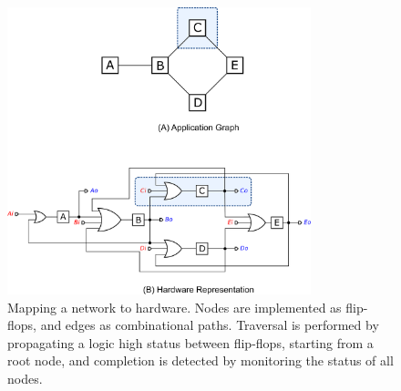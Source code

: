 
\begin{figure}[!t]
\begin{center}

\includegraphics[width=8.8cm]{figures/fig_mapping}

\caption{
Mapping a network to hardware. Nodes are implemented as flip-flops, and edges as combinational paths.
Traversal is performed by propagating a logic high status between flip-flops, starting from a root node,
and completion is detected by monitoring the status of all nodes.
}

\label{fig_mapping}
\end{center}

\end{figure}
